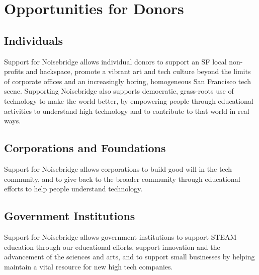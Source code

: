 \documentclass[12pt]{article}
\begin{document}
\section{Opportunities for Donors}

\subsection{Individuals}

Support for Noisebridge allows individual donors to support an SF local non-profits and hackspace, promote a vibrant art and tech culture beyond the limits of corporate offices and an increasingly boring, homogeneous San Francisco tech scene. Supporting Noisebridge also supports democratic, grass-roots use of technology to make the world better, by empowering people through educational activities to understand high technology and to contribute to that world in real ways.

\subsection{Corporations and Foundations}

Support for Noisebridge allows corporations to build good will in the tech community, and to give back to the broader community through educational efforts to help people understand technology.

\subsection{Government Institutions}

Support for Noisebridge allows government institutions to support STEAM education through our educational efforts, support innovation and the advancement of the sciences and arts, and to support small businesses by helping maintain a vital resource for new high tech companies.
\end{document}
